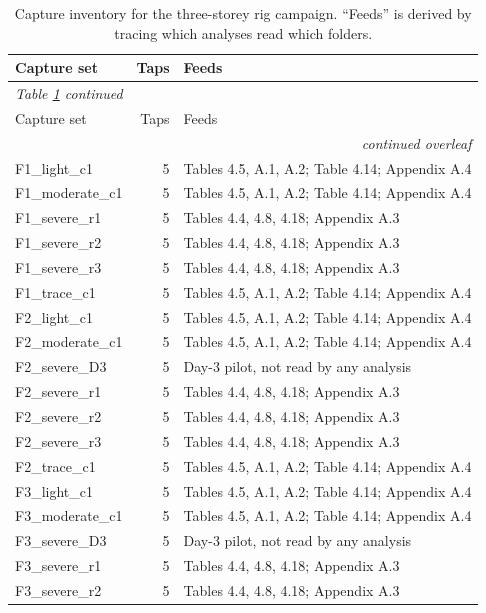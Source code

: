 \begin{longtable}{@{}l r >{\raggedright\arraybackslash}p{}@{}}
\caption{Capture inventory for the three-storey rig campaign. ``Feeds'' is
derived by tracing which analyses read which folders.}
\label{tab:inventory} \\
\toprule
Capture set & Taps & Feeds \\
\midrule
\endfirsthead
\multicolumn{3}{l}{\small\itshape Table \ref{tab:inventory} continued} \\
\toprule
Capture set & Taps & Feeds \\
\midrule
\endhead
\midrule
\multicolumn{3}{r}{\small\itshape continued overleaf} \\
\endfoot
\bottomrule
\endlastfoot
F1\_light\_c1 & 5 & Tables 4.5, A.1, A.2; Table 4.14; Appendix A.4 \\
F1\_moderate\_c1 & 5 & Tables 4.5, A.1, A.2; Table 4.14; Appendix A.4 \\
F1\_severe\_r1 & 5 & Tables 4.4, 4.8, 4.18; Appendix A.3 \\
F1\_severe\_r2 & 5 & Tables 4.4, 4.8, 4.18; Appendix A.3 \\
F1\_severe\_r3 & 5 & Tables 4.4, 4.8, 4.18; Appendix A.3 \\
F1\_trace\_c1 & 5 & Tables 4.5, A.1, A.2; Table 4.14; Appendix A.4 \\
F2\_light\_c1 & 5 & Tables 4.5, A.1, A.2; Table 4.14; Appendix A.4 \\
F2\_moderate\_c1 & 5 & Tables 4.5, A.1, A.2; Table 4.14; Appendix A.4 \\
F2\_severe\_D3 & 5 & Day-3 pilot, not read by any analysis \\
F2\_severe\_r1 & 5 & Tables 4.4, 4.8, 4.18; Appendix A.3 \\
F2\_severe\_r2 & 5 & Tables 4.4, 4.8, 4.18; Appendix A.3 \\
F2\_severe\_r3 & 5 & Tables 4.4, 4.8, 4.18; Appendix A.3 \\
F2\_trace\_c1 & 5 & Tables 4.5, A.1, A.2; Table 4.14; Appendix A.4 \\
F3\_light\_c1 & 5 & Tables 4.5, A.1, A.2; Table 4.14; Appendix A.4 \\
F3\_moderate\_c1 & 5 & Tables 4.5, A.1, A.2; Table 4.14; Appendix A.4 \\
F3\_severe\_D3 & 5 & Day-3 pilot, not read by any analysis \\
F3\_severe\_r1 & 5 & Tables 4.4, 4.8, 4.18; Appendix A.3 \\
F3\_severe\_r2 & 5 & Tables 4.4, 4.8, 4.18; Appendix A.3 \\

\end{longtable}
